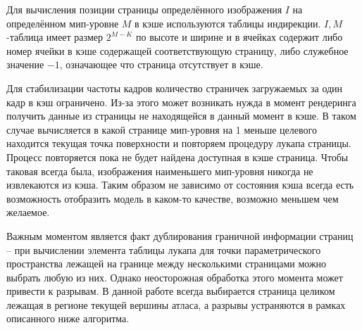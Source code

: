 \documentclass[12pt]{extarticle}
\begin{document}
Для вычисления позиции страницы определённого изображения $I$ на определённом мип-уровне $M$ в кэше используются таблицы индирекции. $I,M$-таблица имеет размер $2^{M - K}$ по высоте и ширине и в ячейках содержит либо номер ячейки в кэше содержащей соответствующую страницу, либо служебное значение $-1$, означающее что страница отсутствует в кэше.

Для стабилизации частоты кадров количество страничек загружаемых за один кадр в кэш ограничено. Из-за этого может возникать нужда в момент рендеринга получить данные из страницы не находящейся в данный момент в кэше. В таком случае вычисляется в какой странице мип-уровня на 1 меньше целевого находится текущая точка поверхности и повторяем процедуру лукапа страницы. Процесс повторяется пока не будет найдена доступная в кэше страница. Чтобы таковая всегда была, изображения наименьшего мип-уровня никогда не извлекаются из кэша. Таким образом не зависимо от состояния кэша всегда есть возможность отобразить модель в каком-то качестве, возможно меньшем чем желаемое.

Важным моментом является факт дублирования граничной информации страниц -- при вычислении элемента таблицы лукапа для точки параметрического пространства лежащей на границе между несколькими страницами можно выбрать любую из них. Однако неосторожная обработка этого момента может привести к разрывам. В данной работе всегда выбирается страница целиком лежащая в регионе текущей вершины атласа, а разрывы устраняются в рамках описанного ниже алгоритма.
\end{document}

